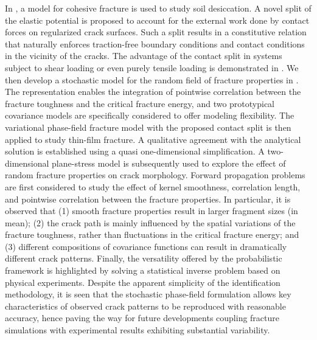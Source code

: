 In , a model for cohesive fracture is used to study soil desiccation. A novel split of the elastic potential is proposed to account for the external work done by contact forces on regularized crack surfaces. Such a split results in a constitutive relation that naturally enforces traction-free boundary conditions and contact conditions in the vicinity of the cracks. The advantage of the contact split in systems subject to shear loading or even purely tensile loading is demonstrated in . We then develop a stochastic model for the random field of fracture properties in . The representation enables the integration of pointwise correlation between the fracture toughness and the critical fracture energy, and two prototypical covariance models are specifically considered to offer modeling flexibility.
The variational phase-field fracture model with the proposed contact split is then applied to study thin-film fracture. A qualitative agreement with the analytical solution is established using a quasi one-dimensional simplification. A two-dimensional plane-stress model is subsequently used to explore the effect of random fracture properties on crack morphology. Forward propagation problems are first considered to study the effect of kernel smoothness, correlation length, and pointwise correlation between the fracture properties. In particular, it is observed that (1) smooth fracture properties result in larger fragment sizes (in mean); (2) the crack path is mainly influenced by the spatial variations of the fracture toughness, rather than fluctuations in the critical fracture energy; and (3) different compositions of covariance functions can result in dramatically different crack patterns. Finally, the versatility offered by the probabilistic framework is highlighted by solving a statistical inverse problem based on physical experiments. Despite the apparent simplicity of the identification methodology, it is seen that the stochastic phase-field formulation allows key characteristics of observed crack patterns to be reproduced with reasonable accuracy, hence paving the way for future developments coupling fracture simulations with experimental results exhibiting substantial variability.

